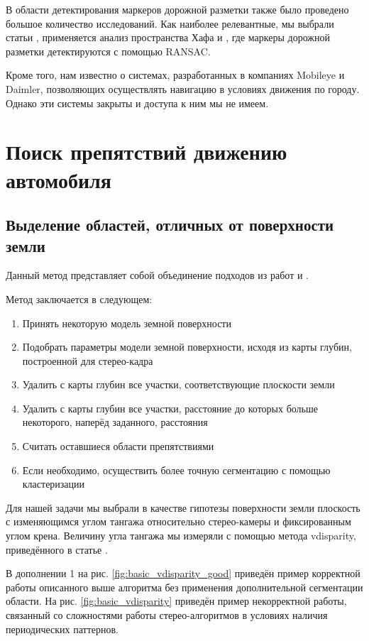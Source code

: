 \documentclass[aps,%
14pt,%
final,%
oneside,
onecolumn,%
musixtex, %
superscriptaddress,%
centertags]{extarticle} %
\begin{document}
В области детектирования маркеров дорожной разметки также было проведено большое количество исследований. Как наиболее релевантные, мы выбрали статьи \cite{song2017real}, применяется анализ пространства Хафа и \cite{aly2008real}, где маркеры дорожной разметки детектируются с помощью RANSAC. 

Кроме того, нам известно о системах, разработанных в компаниях Mobileye и Daimler, позволяющих осуществлять навигацию в условиях движения по городу. Однако эти системы закрыты и доступа к ним мы не имеем.

\section {Поиск препятствий движению автомобиля }

\subsection{Выделение областей, отличных от поверхности земли }

Данный метод представляет собой объединение подходов из работ \cite{labayrade2002real} и \cite{broggi2006single}.

Метод заключается в следующем:
\begin{enumerate}
    \item Принять некоторую модель земной поверхности
    \item Подобрать параметры модели земной поверхности, исходя из карты глубин, построенной для стерео-кадра
    \item Удалить с карты глубин все участки, соответствующие плоскости земли
    \item Удалить с карты глубин все участки, расстояние до которых больше некоторого, наперёд заданного, расстояния
    \item Считать оставшиеся области препятствиями
    \item Если необходимо, осуществить более точную сегментацию с помощью кластеризации
\end{enumerate}

Для нашей задачи мы выбрали в качестве гипотезы поверхности земли плоскость с изменяющимся углом тангажа относительно стерео-камеры и фиксированным углом крена. Величину угла тангажа мы измеряли с помощью метода vdisparity, приведённого в статье \cite{labayrade2002real}.

В дополнении 1 на рис. \ref{fig:basic_vdisparity_good} приведён пример корректной работы описанного выше алгоритма без применения дополнительной сегментации области. На рис. \ref{fig:basic_vdisparity} приведён пример некорректной работы, связанный со сложностями работы стерео-алгоритмов в условиях наличия периодических паттернов. 
\end{document}
